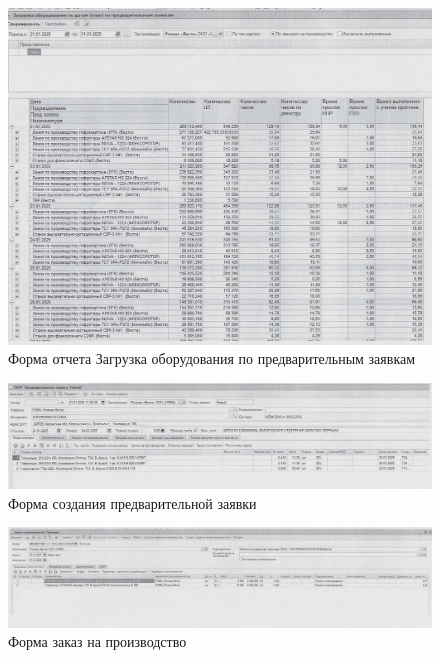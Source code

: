 \begin{figure}
\begin{center}
\includegraphics[height=0.5\textheight, keepaspectratio]{Pics/I.5.2...jpg}
\end{center}
\caption{Форма отчета Загрузка оборудования по предварительным заявкам}
\label{pic:I.5.2...jpg}
\end{figure}



\begin{figure}
\begin{center}
\includegraphics[height=0.15\textheight,  keepaspectratio]{Pics/I.5.jpg}
\end{center}
\caption{Форма создания предварительной заявки}
\label{pic:I.5.jpg}
\end{figure}
\clearpage

\begin{figure}
\begin{center}
\includegraphics[height=0.15\textheight,  keepaspectratio]{Pics/I.5.4.jpg}
\end{center}
\caption{Форма заказ на производство}
\label{pic:I.5.4.jpg}
\end{figure}

